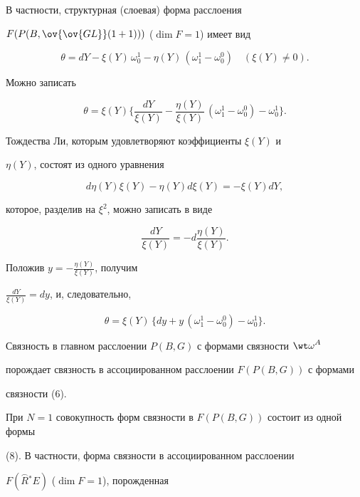 В частности, структурная (слоевая) форма расслоения 


$F ({P ({B,\ov{\ov {GL}} ({1+1})})})$ (${\dim F=1}$) имеет вид


$$


\theta=dY-\xi (Y)\,\omega_0^1-\eta (Y)\, ({\omega_1^1-\omega_0^0})


\quad ({\xi (Y) \ne 0}).


$$


Можно записать


$$


\theta=\xi (Y)\bigg\{{\frac{{dY}}{{\xi (Y)}}-


\frac{{\eta (Y)}}{{\xi (Y)}}\,


({\omega_1^1-\omega_0^0})-\omega_0^1}\bigg \}.


$$


Тождества Ли, которым удовлетворяют коэффициенты $\xi (Y)$ и


$\eta (Y)$, состоят из одного уравнения


$$


d\eta (Y) \xi (Y)-\eta (Y) d\xi (Y)=- \xi (Y) dY,


$$


которое, разделив на $\xi^2$, можно записать в виде


$$


\frac{{dY}}{{\xi (Y)}}=- d\frac{{\eta (Y)}}{{\xi (Y)}}.


$$


Положив $y=- \frac{{\eta (Y)}}{{\xi (Y)}}$, получим


$\frac{{dY}}{{\xi (Y)}}=dy$, и, следовательно,


$$


\theta=\xi (Y)\, \{{dy+y\, ({\omega_1^1-\omega_0^0})-\omega_0^1} \}.


$$





Связность в главном расслоении $P(B,G)$ с формами связности ${\wt \omega}^A$


порождает связность в ассоциированном расслоении $F(P(B,G))$ с формами 


связности (6).





При $N=1$ совокупность форм связности в $F(P(B,G))$ состоит из одной формы


(8). В частности, форма связности в ассоциированном расслоении


$F (\overset{\frown}{R}{}^ * E)$ (${\dim F=1}$), порожденная 


